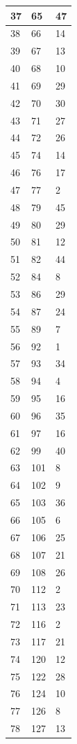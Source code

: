 \begin{tabular}{p{}p{}p{}}
\hline
37 & 65 & 47 \\
\hline
38 & 66 & 14 \\
\hline
39 & 67 & 13 \\
\hline
40 & 68 & 10 \\
\hline
41 & 69 & 29 \\
\hline
42 & 70 & 30 \\
\hline
43 & 71 & 27 \\
\hline
44 & 72 & 26 \\
\hline
45 & 74 & 14 \\
\hline
46 & 76 & 17 \\
\hline
47 & 77 & 2 \\
\hline
48 & 79 & 45 \\
\hline
49 & 80 & 29 \\
\hline
50 & 81 & 12 \\
\hline
51 & 82 & 44 \\
\hline
52 & 84 & 8 \\
\hline
53 & 86 & 29 \\
\hline
54 & 87 & 24 \\
\hline
55 & 89 & 7 \\
\hline
56 & 92 & 1 \\
\hline
57 & 93 & 34 \\
\hline
58 & 94 & 4 \\
\hline
59 & 95 & 16 \\
\hline
60 & 96 & 35 \\
\hline
61 & 97 & 16 \\
\hline
62 & 99 & 40 \\
\hline
63 & 101 & 8 \\
\hline
64 & 102 & 9 \\
\hline
65 & 103 & 36 \\
\hline
66 & 105 & 6 \\
\hline
67 & 106 & 25 \\
\hline
68 & 107 & 21 \\
\hline
69 & 108 & 26 \\
\hline
70 & 112 & 2 \\
\hline
71 & 113 & 23 \\
\hline
72 & 116 & 2 \\
\hline
73 & 117 & 21 \\
\hline
74 & 120 & 12 \\
\hline
75 & 122 & 28 \\
\hline
76 & 124 & 10 \\
\hline
77 & 126 & 8 \\
\hline
78 & 127 & 13 \\

\end{tabular}

